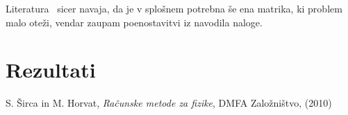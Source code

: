 \documentclass[a4 paper, 12pt]{article}
\begin{document}
Literatura~\cite[str.~659]{sirca} sicer navaja, da je v splo\v snem potrebna \v se ena matrika, ki problem malo
ote\v zi, vendar zaupam poenostavitvi iz navodila naloge.
\section{Rezultati}

\begin{thebibliography}{9}
		S. \v Sirca in M. Horvat,
		{\em Ra\v cunske metode za fizike},
		DMFA Zalo\v zni\v stvo,
		(2010)
\end{thebibliography}
\end{document}
